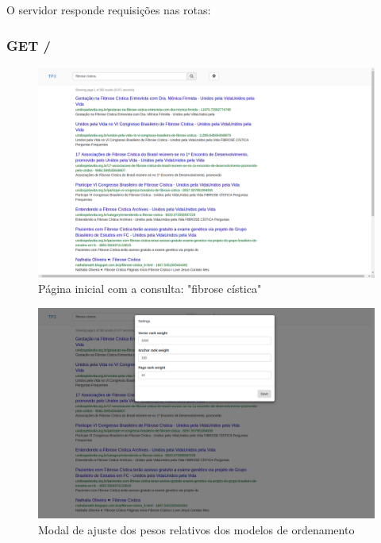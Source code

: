 \documentclass{article}
\begin{document}
O servidor responde requisições nas rotas:

\subsubsection{GET /}

\begin{figure}
\centering
\includegraphics[width=\linewidth]{page_1.png}
\caption{Página inicial com a consulta: "fibrose cística"} 
\label{fig:page_1}
\end{figure}

\begin{figure}
\centering
\includegraphics[width=\linewidth]{page_1_modal.png}
\caption{Modal de ajuste dos pesos relativos dos modelos de ordenamento} 
\label{fig:page_1_modal}
\end{figure}
\end{document}
